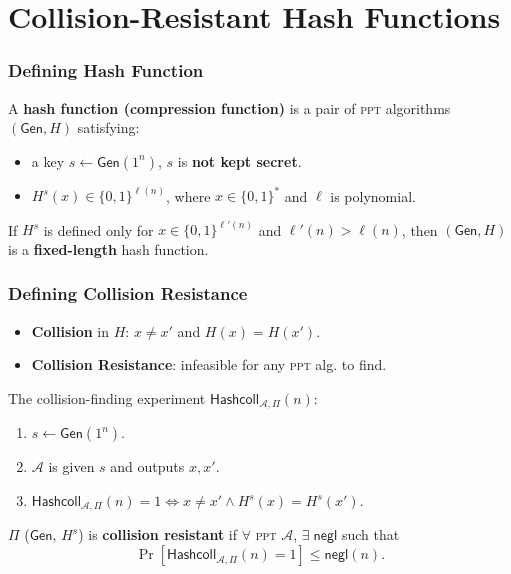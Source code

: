 \section{Collision-Resistant Hash Functions}
\begin{frame}\frametitle{Defining Hash Function}
\begin{figure}
\begin{center}

\end{center}
\end{figure}
\begin{definition}
A \textbf{hash function (compression function)} is a pair of \textsc{ppt} algorithms $(\mathsf{Gen}, H)$ satisfying:
\begin{itemize}
\item a key $s \gets \mathsf{Gen}(1^n)$, $s$ is \textbf{not kept secret}.
\item $H^s(x) \in \{0,1\}^{\ell(n)}$, where $x \in \{0,1\}^*$ and $\ell$ is polynomial.
\end{itemize}
If $H^s$ is defined only for $x \in \{0,1\}^{\ell'(n)}$ and $\ell'(n) > \ell(n)$, then $(\mathsf{Gen}, H)$ is a \textbf{fixed-length} hash function.
\end{definition}
\end{frame}
\begin{frame}\frametitle{Defining Collision Resistance}
\begin{itemize}
\item \textbf{Collision} in $H$: $x \neq x'$ and $H(x) = H(x')$.
\item \textbf{Collision Resistance}: infeasible for any \textsc{ppt} alg. to find.
\end{itemize}
The collision-finding experiment $\mathsf{Hashcoll}_{\mathcal{A},\Pi}(n)$:
\begin{enumerate}
\item $s \gets \mathsf{Gen}(1^n)$.
\item $\mathcal{A}$ is given $s$ and outputs $x, x'$.
\item $\mathsf{Hashcoll}_{\mathcal{A},\Pi}(n) =1 \iff x\ne x' \land H^s(x) = H^s(x')$.
\end{enumerate}
\begin{definition}
$\Pi$ ($\mathsf{Gen}$, $H^s$) is \textbf{collision resistant} if $\forall$ \textsc{ppt} $\mathcal{A}$, $\exists\;\mathsf{negl}$ such that
\[ \Pr[\mathsf{Hashcoll}_{\mathcal{A},\Pi}(n)=1] \le \mathsf{negl}(n).
\]
\end{definition}
\end{frame}
